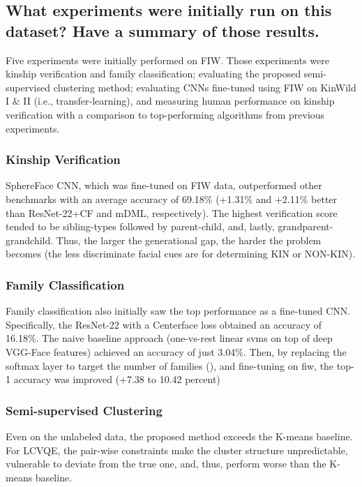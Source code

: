 \subsection*{What experiments were initially run on this dataset? Have a summary of those results.}

Five experiments were initially performed on FIW. Those experiments were kinship verification and family classification; evaluating the proposed semi-supervised clustering method; evaluating CNNs fine-tuned using FIW on KinWild I \& II (i.e., transfer-learning), and measuring human performance on kinship verification with a comparison to top-performing algorithms from previous experiments.
\subsubsection*{{Kinship Verification}}
SphereFace CNN, which was fine-tuned on FIW data, outperformed other benchmarks with an average accuracy of 69.18\% (\ie +1.31\% and +2.11\% better than ResNet-22+CF and mDML, respectively). The highest verification score tended to be sibling-types followed by parent-child, and, lastly, grandparent-grandchild. Thus, the larger the generational gap, the harder the problem becomes (\ie the less discriminate facial cues are for determining KIN or NON-KIN).


\subsubsection*{{Family Classification}}
Family classification also initially saw the top performance as a fine-tuned CNN. Specifically, the ResNet-22 with a Centerface loss obtained an accuracy of 16.18\%. The naive baseline approach (one-vs-rest linear \glspl{svm} on top of deep VGG-Face features) achieved an accuracy of just 3.04\%. Then, by replacing the softmax layer to target the number of families (), and fine-tuning on \gls{fiw}, the top-1 accuracy was improved (\ie +7.38 to 10.42 percent)

\subsubsection*{Semi-supervised Clustering}
Even on the unlabeled data, the proposed method exceeds the K-means baseline. For LCVQE, the pair-wise constraints make the cluster structure unpredictable, vulnerable to deviate from the true one, and, thus, perform worse than the K-means baseline.


